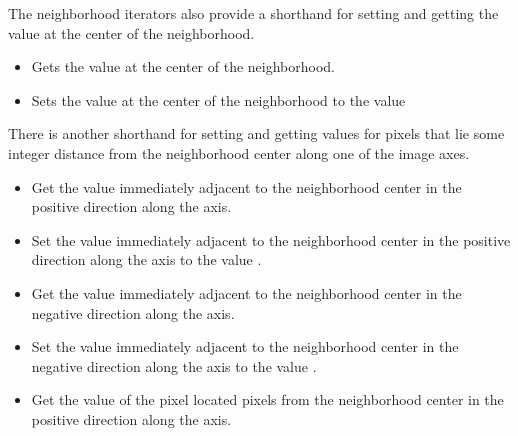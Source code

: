 {The neighborhood iterators also provide a shorthand for setting and getting the
value at the center of the neighborhood.

\begin{itemize}

\item \textbf{} Gets the value at the center
of the neighborhood.

\item \textbf{} Sets the value at the
center of the neighborhood to the value 

\end{itemize}

There is another shorthand for setting and getting values for pixels that
lie some integer distance from the neighborhood center along one of the image
axes.

\begin{itemize}

\item \textbf{} Get the value
immediately adjacent to the neighborhood center in the positive direction along
the  axis.

\item \textbf{} Set the value
immediately adjacent to the neighborhood center in the positive direction along
the  axis to the value .

\item \textbf{} Get the value
immediately adjacent to the neighborhood center in the negative direction along
the  axis.

\item \textbf{}
Set the value immediately adjacent to the neighborhood center in the
negative direction along the  axis to the value .

\item \textbf{} Get the value of the pixel located  pixels from the
neighborhood center in the positive direction along the  axis.


\end{itemize}}
